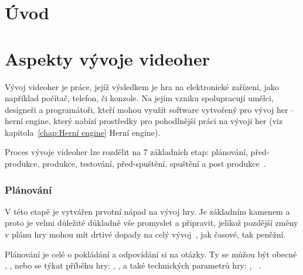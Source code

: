 
%

\chapter{Úvod}






\chapter{Aspekty vývoje videoher}
Vývoj videoher je práce, jejíž výsledkem je hra na elektronické zařízení, jako například počítač, telefon, či konzole. Na jejím vzniku spolupracují umělci, designeři a programátoři, kteří mohou využít software vytvořený pro vývoj her\,--\,herní engine, který nabízí prostředky pro pohodlnější práci na vývoji her (viz kapitola~\ref{chap:Herní engine} Herní engine).

Proces vývoje videoher lze rozdělit na 7 základních etap: plánování, před-produkce, produkce, testování, před-spuštění, spuštění a post produkce~\cite{g2_game_development}.
\subsection*{Plánování}
V této etapě je vytvářen prvotní nápad na vývoj hry. Je základním kamenem a proto je velmi důležité důkladně vše promyslet a připravit, jelikož pozdější změny v plánu hry mohou mít drtivé dopady na celý vývoj~\cite{GameMaker_development}, jak časové, tak peněžní. 

Plánování je celé o pokládání a odpovídání si na otázky. Ty se můžou být obecné , , nebo se týkat příběhu hry: , ,  a také technických parametrů hry: , ~\cite{g2_game_development}.

